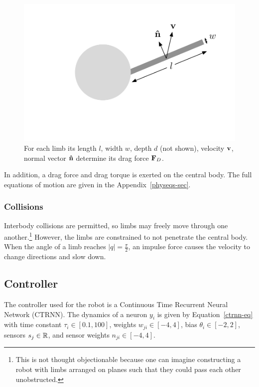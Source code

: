\begin{figure}[h]
  \begin{center} 
    \includegraphics[scale=0.7]{fig/drag-force.pdf} 
  \end{center} 
  \caption{For each limb its length $l$, width $w$, depth $d$ (not
    shown), velocity $\mathbf{v} $, normal vector $\mathbf{\hat{n}}$ determine its
    drag force $\mathbf{F}_D$.}
  \label{drag-force}
\end{figure}

In addition, a drag force and drag torque is exerted on the central
body.  The full equations of motion are given in the
Appendix~\ref{physeqs-sec}.

\subsubsection{Collisions}

Interbody collisions are permitted, so limbs may freely move through
one another.\footnote{This is not thought objectionable because one
  can imagine constructing a robot with limbs arranged on planes such
  that they could pass each other unobstructed.}  However, the limbs
are constrained to not penetrate the central body.  When the angle of
a limb reaches $|q| = \frac{\pi}{2}$, an impulse force causes the
velocity to change directions and slow down.


\subsection{Controller}

The controller used for the robot is a Continuous Time Recurrent
Neural Network (CTRNN).  The dynamics of a neuron $y_i$ is given by
Equation~\ref{ctrnn-eq} with time constant $\tau_i \in [0.1, 100]$,
weights $w_{ji} \in [-4, 4]$, bias $\theta_i \in [-2, 2]$, sensors
$s_j \in \mathbb{R} $, and sensor weights $n_{ji} \in [-4, 4]$.

